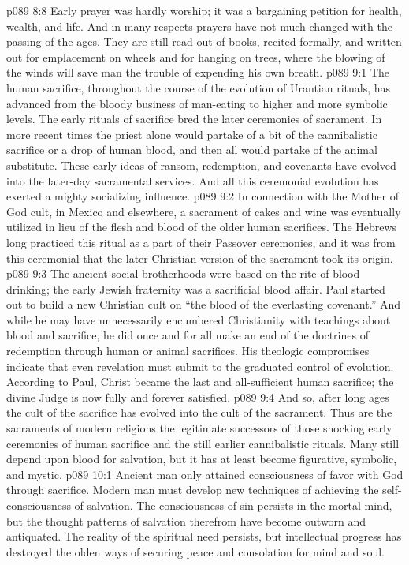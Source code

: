 \vs p089 8:8 Early prayer was hardly worship; it was a bargaining petition for health, wealth, and life. And in many respects prayers have not much changed with the passing of the ages. They are still read out of books, recited formally, and written out for emplacement on wheels and for hanging on trees, where the blowing of the winds will save man the trouble of expending his own breath.
\vs p089 9:1 The human sacrifice, throughout the course of the evolution of Urantian rituals, has advanced from the bloody business of man\hyp{}eating to higher and more symbolic levels. The early rituals of sacrifice bred the later ceremonies of sacrament. In more recent times the priest alone would partake of a bit of the cannibalistic sacrifice or a drop of human blood, and then all would partake of the animal substitute. These early ideas of ransom, redemption, and covenants have evolved into the later\hyp{}day sacramental services. And all this ceremonial evolution has exerted a mighty socializing influence.
\vs p089 9:2 In connection with the Mother of God cult, in Mexico and elsewhere, a sacrament of cakes and wine was eventually utilized in lieu of the flesh and blood of the older human sacrifices. The Hebrews long practiced this ritual as a part of their Passover ceremonies, and it was from this ceremonial that the later Christian version of the sacrament took its origin.
\vs p089 9:3 The ancient social brotherhoods were based on the rite of blood drinking; the early Jewish fraternity was a sacrificial blood affair. Paul started out to build a new Christian cult on “the blood of the everlasting covenant.” And while he may have unnecessarily encumbered Christianity with teachings about blood and sacrifice, he did once and for all make an end of the doctrines of redemption through human or animal sacrifices. His theologic compromises indicate that even revelation must submit to the graduated control of evolution. According to Paul, Christ became the last and all\hyp{}sufficient human sacrifice; the divine Judge is now fully and forever satisfied.
\vs p089 9:4 And so, after long ages the cult of the sacrifice has evolved into the cult of the sacrament. Thus are the sacraments of modern religions the legitimate successors of those shocking early ceremonies of human sacrifice and the still earlier cannibalistic rituals. Many still depend upon blood for salvation, but it has at least become figurative, symbolic, and mystic.
\vs p089 10:1 Ancient man only attained consciousness of favor with God through sacrifice. Modern man must develop new techniques of achieving the self\hyp{}consciousness of salvation. The consciousness of sin persists in the mortal mind, but the thought patterns of salvation therefrom have become outworn and antiquated. The reality of the spiritual need persists, but intellectual progress has destroyed the olden ways of securing peace and consolation for mind and soul.
